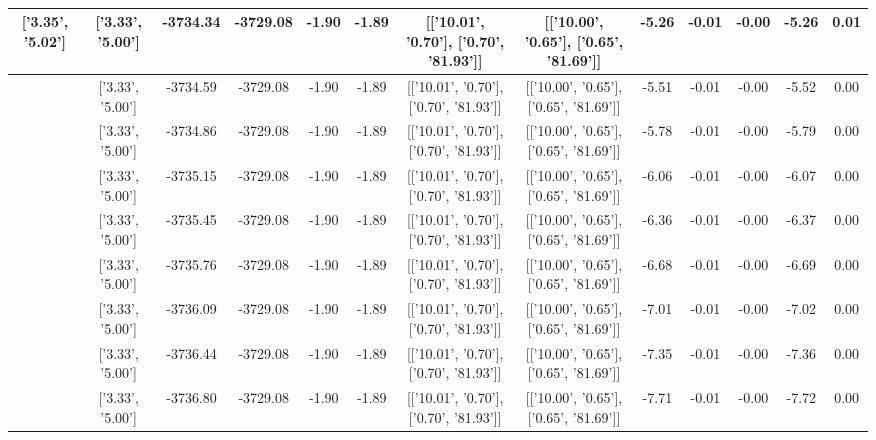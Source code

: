 \begin{table}[htbp]
\begin{adjustbox}{angle=90}
\begin{tabular}{|c|c|c|c|c|c|c|c|c|c|c|c|c|}
 ['3.35', '5.02'] & ['3.33', '5.00'] & -3734.34 & -3729.08 & -1.90 & -1.89 & [['10.01', '0.70'], ['0.70', '81.93']] & [['10.00', '0.65'], ['0.65', '81.69']] & -5.26 & -0.01 & -0.00 & -5.26 & 0.01\\ \hline
 ['3.35', '5.02'] & ['3.33', '5.00'] & -3734.59 & -3729.08 & -1.90 & -1.89 & [['10.01', '0.70'], ['0.70', '81.93']] & [['10.00', '0.65'], ['0.65', '81.69']] & -5.51 & -0.01 & -0.00 & -5.52 & 0.00\\ \hline
 ['3.35', '5.02'] & ['3.33', '5.00'] & -3734.86 & -3729.08 & -1.90 & -1.89 & [['10.01', '0.70'], ['0.70', '81.93']] & [['10.00', '0.65'], ['0.65', '81.69']] & -5.78 & -0.01 & -0.00 & -5.79 & 0.00\\ \hline
 ['3.35', '5.02'] & ['3.33', '5.00'] & -3735.15 & -3729.08 & -1.90 & -1.89 & [['10.01', '0.70'], ['0.70', '81.93']] & [['10.00', '0.65'], ['0.65', '81.69']] & -6.06 & -0.01 & -0.00 & -6.07 & 0.00\\ \hline
 ['3.35', '5.02'] & ['3.33', '5.00'] & -3735.45 & -3729.08 & -1.90 & -1.89 & [['10.01', '0.70'], ['0.70', '81.93']] & [['10.00', '0.65'], ['0.65', '81.69']] & -6.36 & -0.01 & -0.00 & -6.37 & 0.00\\ \hline
 ['3.36', '5.02'] & ['3.33', '5.00'] & -3735.76 & -3729.08 & -1.90 & -1.89 & [['10.01', '0.70'], ['0.70', '81.93']] & [['10.00', '0.65'], ['0.65', '81.69']] & -6.68 & -0.01 & -0.00 & -6.69 & 0.00\\ \hline
 ['3.36', '5.02'] & ['3.33', '5.00'] & -3736.09 & -3729.08 & -1.90 & -1.89 & [['10.01', '0.70'], ['0.70', '81.93']] & [['10.00', '0.65'], ['0.65', '81.69']] & -7.01 & -0.01 & -0.00 & -7.02 & 0.00\\ \hline
 ['3.36', '5.02'] & ['3.33', '5.00'] & -3736.44 & -3729.08 & -1.90 & -1.89 & [['10.01', '0.70'], ['0.70', '81.93']] & [['10.00', '0.65'], ['0.65', '81.69']] & -7.35 & -0.01 & -0.00 & -7.36 & 0.00\\ \hline
 ['3.36', '5.02'] & ['3.33', '5.00'] & -3736.80 & -3729.08 & -1.90 & -1.89 & [['10.01', '0.70'], ['0.70', '81.93']] & [['10.00', '0.65'], ['0.65', '81.69']] & -7.71 & -0.01 & -0.00 & -7.72 & 0.00\\ \hline
            \end{tabular}
        \end{adjustbox}
        \caption{}
        \label{}
    \end{table}
    